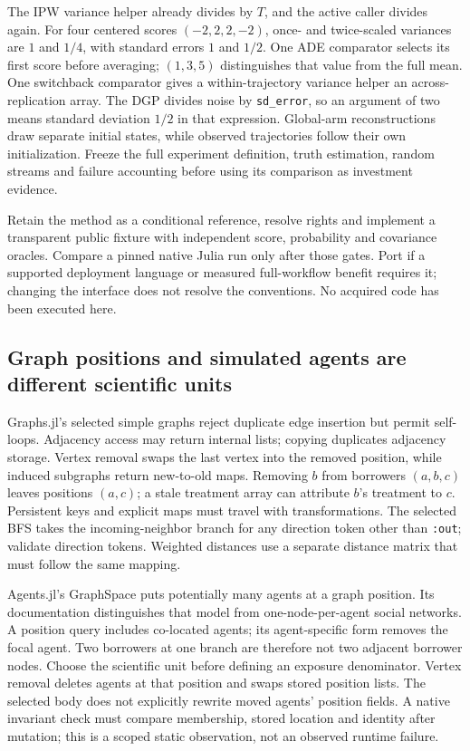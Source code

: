 The IPW variance helper already divides by $T$, and the active caller divides
again. For four centered scores $(-2,2,2,-2)$, once- and twice-scaled variances
are $1$ and $1/4$, with standard errors $1$ and $1/2$. One ADE comparator
selects its first score before averaging; $(1,3,5)$ distinguishes that value
from the full mean. One switchback comparator gives a within-trajectory
variance helper an across-replication array. The DGP divides noise by
\texttt{sd\_error}, so an argument of two means standard deviation $1/2$
in that expression. Global-arm reconstructions draw separate initial states,
while observed trajectories follow their own initialization. Freeze the full
experiment definition, truth estimation, random streams and failure accounting
before using its comparison as investment evidence.
\citep{exec25_onet_dml,exec25_onet_choice}

Retain the method as a conditional reference, resolve rights and implement a
transparent public fixture with independent score, probability and covariance
oracles. Compare a pinned native Julia run only after those gates. Port if a
supported deployment language or measured full-workflow benefit requires it;
changing the interface does not resolve the conventions. No acquired code has
been executed here.~\citep{exec25_onet_choice}

\subsection{Graph positions and simulated agents are different scientific units}

Graphs.jl's selected simple graphs reject duplicate edge insertion but permit
self-loops. Adjacency access may return internal lists; copying duplicates
adjacency storage. Vertex removal swaps the last vertex into the removed
position, while induced subgraphs return new-to-old maps. Removing $b$ from
borrowers $(a,b,c)$ leaves positions $(a,c)$; a stale treatment array can
attribute $b$'s treatment to $c$. Persistent keys and explicit maps must travel
with transformations. The selected BFS takes the incoming-neighbor branch
for any direction token other than \texttt{:out}; validate direction tokens.
Weighted distances use a separate distance matrix that must follow the same
mapping.~\citep{exec25_onet_graphs,exec25_onet_choice}

Agents.jl's GraphSpace puts potentially many agents at a graph position. Its
documentation distinguishes that model from one-node-per-agent social
networks. A position query includes co-located agents; its agent-specific form
removes the focal agent. Two borrowers at one branch are therefore not two
adjacent borrower nodes. Choose the scientific unit before defining an exposure
denominator. Vertex removal deletes agents at that position and swaps stored
position lists. The selected body does not explicitly rewrite moved agents'
position fields. A native invariant check must compare membership, stored
location and identity after mutation; this is a scoped static observation,
not an observed runtime failure.~\citep{exec25_onet_agents,exec25_onet_choice}

